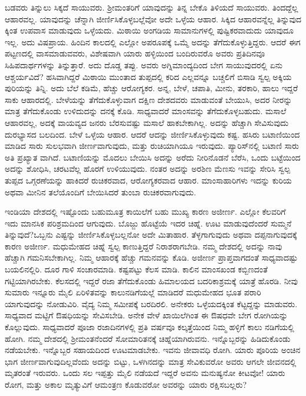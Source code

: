 ಬಡವರು ತಿನ್ನುಲು ಸಿಕ್ಕದೆ ಸಾಯುವರು. ಶ‍್ರೀಮಂತರಿಗೆ ಯಾವುದನ್ನು ತಿನ್ನ ಬೇಕೊ ತಿಳಿಯದೆ ಸಾಯುವರು. ತಿಂದದ್ದೆಲ್ಲ ಆಹಾರವಲ್ಲ. ಯಾವುದನ್ನು ಚೆನ್ನಾಗಿ ಜೀರ್ಣಿಸಿಕೊಳ್ಳಬಲ್ಲೆವೋ ಅದೇ ಒಳ್ಳೆಯ ಆಹಾರ. ಸಿಕ್ಕಿದ ಆಹಾರವನ್ನೆಲ್ಲ ತಿನ್ನುವುದ ಕ್ಕಿಂತ ಉಪವಾಸ ಮಾಡುವುದು ಒಳ್ಳೆಯದು. ಮಿಠಾಯಿ ಅಂಗಡಿಯ ಸಾಮಾನುಗಳಲ್ಲಿ ಪುಷ್ಟಿಕರವಾದುದು ಯಾವುದೂ ಇಲ್ಲ. ಅದು ವಿಷಪ್ರಾಯ. ಹಿಂದಿನ ಕಾಲದಲ್ಲಿ ಎಲ್ಲೋ ಅಪರೂಪಕ್ಕೆ ಒಮ್ಮೆ ಅದನ್ನು ತೆಗೆದುಕೊಳ್ಳುತ್ತಿದ್ದರು. ಆದರೆ ಈಗ ಪಟ್ಟಣದಲ್ಲಿ ವಾಸಮಾಡು\break ವವರು, ವಿಶೇಷವಾಗಿ ಯಾರು ಹಳ್ಳಿಯಿಂದ ಬಂದಿರುವರೊ ಅವರು ಪ್ರತಿದಿನವೂ ಸಿಹಿಪದಾರ್ಥಗಳನ್ನು ತಿನ್ನುತ್ತಾರೆ. ಅದು ದೊಡ್ಡ ತಪ್ಪು. ಅವರು ಅಗ್ನಿಮಾಂದ್ಯದಿಂದ ಬೇಗ ಸಾಯುವುದರಲ್ಲಿ ಏನು ಆಶ್ಚರ್ಯವಿದೆ? ಹಸಿವಾಗಿದ್ದರೆ ಮಿಠಾಯಿ ಮುಂತಾದ ತುಪ್ಪದಲ್ಲಿ ಕರಿದ ಎಲ್ಲವನ್ನೂ ಬಚ್ಚಲಿಗೆ ಬಿಸಾಡಿ ಸ್ವಲ್ಪ ಅಕ್ಕಿಯ ಪುರಿಯನ್ನು ತಿನ್ನಿ. ಅದು ಬೆಲೆ ಕಡಿಮೆ, ಹೆಚ್ಚು ಆರೋಗ್ಯಕರ. ಅನ್ನ, ಬೇಳೆ, ಚಪಾತಿ, ಮೀನು, ತರಕಾರಿ, ಹಾಲು ಇದ್ದರೆ ಸಾಕು ಆಹಾರದಲ್ಲಿ. ಬೇಳೆಯನ್ನು ತೆಗೆದುಕೊಳ್ಳುವಾಗ ದಕ್ಷಿಣ ದೇಶದವರು ಮಾಡುವಂತೆ ಬೇಯುಸಿ, ಅದರ ನೀರನ್ನು ಮಾತ್ರ ತೆಗೆದುಕೊಂಡು ಉಳಿದುದನ್ನು ದನಕ್ಕೆ ಕೊಡಿ. ಸಾಧ್ಯವಾದರೆ ಮಾಂಸವನ್ನು ತೆಗೆದುಕೊಳ್ಳಬಹುದು. ಮಸಾಲೆ ಆಹಾರವಲ್ಲ, ಅದಕ್ಕೆ ವಾಯವ್ಯದ ಜನರು ಬೆರಸುವಷ್ಟು ಮಸಾಲೆ ಹಾಕಬೇಕಾಗಿಲ್ಲ. ಅದನ್ನು ಹೆಚ್ಚಾಗಿ ಸೇವಿಸುವುದು ದುರಭ್ಯಾಸದ ಬಲದಿಂದ. ಬೇಳೆ ಒಳ್ಳೆಯ ಆಹಾರ. ಆದರೆ ಆದನ್ನು ಜೀರ್ಣಿಸಿಕೊಳ್ಳುವುದು ಕಷ್ಟ. ಹಸಿರು ಬಟಾಣಿಯಿಂದ ಮಾಡಿದ ಸಾರು ಸುಲಭವಾಗಿ ಜೀರ್ಣವಾಗುವುದು, ಮತ್ತು ರುಚಿಯಾಗಿಯೂ ಇರುವುದು. ಪ್ಯಾರಿಸ್​ನಲ್ಲಿ ಬಟಾಣಿ ಸಾರು ಅತಿ ಪ್ರಖ್ಯಾತ ವಾಗಿದೆ. ಬಟಾಣಿಯನ್ನು ಮೊದಲು ಬೇಯಿಸಿ ಅದನ್ನು ಅರೆದು ನೀರಿನೊಡನೆ ಬೆರೆಸಿ, ಒಂದು ಬಟ್ಟೆಯಿಂದ ಅದನ್ನು ಶೋಧಿಸಿ, ಚರಟವೆಲ್ಲ ಹೊರಗೆ ಉಳಿಯುವುದು. ನಂತರ ಅದನ್ನು ಅರಶಿಣ ಮೆಣಸು ಇವನ್ನು ಸೇರಿಸಿ ಸ್ವಲ್ಪ ತುಪ್ಪದ ಒಗ್ಗರಣೆಯನ್ನು ಹಾಕಿದರೆ ರುಚಿಕರವಾದ, ಆರೋಗ್ಯಕರವಾದ ಆಹಾರ. ಮಾಂಸಾಹಾರಿಗಳು ಇದನ್ನು ಕುರಿಯ ಅಥವಾ ಮೀನಿನ ತಲೆಯೊಂದಿಗೆ ಬೇಯಿಸಿದರೆ ತುಂಬಾ ರುಚಿಕರವಾಗುವುದು.

ಇಂಡಿಯಾ ದೇಶದಲ್ಲಿ ಇಷ್ಟೊಂದು ಬಹುಮೂತ್ರ ಕಾಯಿಲೆಗೆ ಬಹು ಮುಖ್ಯ ಕಾರಣ ಅಜೀರ್ಣ. ಎಲ್ಲೋ ಕೆಲವರಿಗೆ ಇದು ಮಾನಸಿಕ ಪರಿಶ್ರಮದಿಂದ ಆಗುವುದು. ಬೊಜ್ಜು ಹೊಟ್ಟೆಯೆ ಇದರ ಚಿಹ್ನೆ. ಊಟ ಮಾಡುವುದೆಂದರೆ ಸುಮ್ಮನೆ ತಿನ್ನುವುದೆ?ಒಬ್ಬನು ಎಷ್ಟನ್ನು ಜೀರ್ಣಿಸಿಕೊಳ್ಳಬಲ್ಲನೋ ಅದೇ ಮಿತಾಹಾರ. ತೆಳ್ಳಗಾಗುವುದು ಅಥವಾ ದಪ್ಪನಾಗುವುದಕ್ಕೆ ಕಾರಣ ಅಜೀರ್ಣ. ಮಧುಮೇಹದ ಚಿಹ್ನೆ ಸ್ವಲ್ಪ ಕಾಣುತ್ತಿದ್ದರೆ ನಿರಾಶರಾಗಬೇಡಿ. ನಮ್ಮ ದೇಶದಲ್ಲಿ ಅದನ್ನು ನಾವು ಹೆಚ್ಚಾಗಿ ಗಮನಿಸಬೇಕಾಗಿಲ್ಲ. ನಿಮ್ಮ ಆಹಾರಕ್ಕೆ ಹೆಚ್ಚು ಗಮನವನ್ನು ಕೊಡಿ. ಅಜೀರ್ಣ ಪ್ರಾಪ್ತವಾಗದಂತೆ ಸಾಧ್ಯವಾದಷ್ಟು ಬಯಲಿನಲ್ಲಿರಿ. ದೂರ ಗಾಳಿ ಸಂಚಾರಮಾಡಿ. ಕಷ್ಟಪಟ್ಟು ಕೆಲಸ ಮಾಡಿ. ಕಾಲಿನ ಮಾಂಸಖಂಡ ಕಬ್ಬಿಣದಂತೆ ಗಟ್ಟಿಯಾಗಿರಬೇಕು. ಕೆಲಸದಲ್ಲಿ ಇದ್ದರೆ ರಜಾ ತೆಗೆದುಕೊಂಡು ಹಿಮಾಲಯದ ಬದರಿಕಾ\break ಶ್ರಮಕ್ಕೆ ಯಾತ್ರೆ ಹೊರಡಿ. ನೀವು ಸುಮಾರು ಇನ್ನೂರು ಮೈಲಿ ಏರಿಳಿತವನ್ನು ಕಾಲುನಡಿಗೆ\break ಯಲ್ಲೆ ಮಾಡಿದರೆ ಮಧುಮೇಹದ ಭೂತ ಪರಾರಿ ಯಾಗುವುದನ್ನು ನೋಡುವಿರಿ. ವೈದ್ಯ ನಿಮ್ಮ ಸಮೀಪಕ್ಕೆ ಬರದಿರಲಿ. ಅನೇಕರು ಒಳ್ಳೆಯದಕ್ಕಿಂತ ಕೆಟ್ಟದ್ದನ್ನು ಮಾಡುವರು. ಸಾಧ್ಯವಾದ ಮಟ್ಟಿಗೆ ಔಷಧಿಯನ್ನು ಸೇವಿಸಬೇಡಿ. ಅನೇಕ ವೇಳೆ ಖಾಯಿಲೆಗಿಂತ ಈ ಔಷಧವೇ ಬೇಗ ರೋಗಿಯನ್ನು ಕೊಲ್ಲುವುದು. ಸಾಧ್ಯವಾದರೆ ಪೂಜಾ ರಜಾದಿನಗಳಲ್ಲಿ ಪ್ರತಿ ವರ್ಷವೂ ಕಲ್ಕತ್ತೆಯಿಂದ ನಿಮ್ಮ ಹಳ್ಳಿಗೆ ಕಾಲು ನಡಿಗೆಯಲ್ಲಿ ಹೋಗಿ. ನಮ್ಮ ದೇಶದಲ್ಲಿ ಶ‍್ರೀಮಂತನೆಂದರೆ ಸೋಮಾರಿತನಕ್ಕೆ ಚಿಹ್ನೆಯಾಗಿರುವನು. ಇನ್ನೊಬ್ಬರನ್ನು ಹಿಡಿದುಕೊಂಡು ನಡೆಯಬೇಕು. ಇನ್ನೊಬ್ಬರ ಸಹಾಯದಿಂದ ಊಟಮಾಡಬೇಕು. ಇವನು ಜೀವಾವಧಿ ರೋಗಿ. ಯಾರು ಪೂರಿಯ ಅಂಚಿನ ಭಾಗ ಜೀರ್ಣವಾಗುವುದಿಲ್ಲವೆಂದು ಅದನ್ನು ಬಿಟ್ಟು, ಒಳಗಿನದನ್ನು ಮಾತ್ರ ಸೇವಿಕುವರೋ ಅವರು ಆಗಲೇ ಜೀವನದಲ್ಲಿ ಮೃತರಂತೆ ಇರುವರು. ಒಂದು ಸಲ ಇಪ್ಪತ್ತು ಮೈಲಿ ನಡೆಯದೆ ಇದ್ದರೆ ಅವನು ಮನುಷ್ಯನೋ ಕೀಟವೋ! ಯಾರು ರೋಗ, ಮತ್ತು ಅಕಾಲ ಮೃತ್ಯುವಿಗೆ ಆಮಂತ್ರಣ ಕೊಡುವರೋ ಅವರನ್ನು ಯಾರು ರಕ್ಷಿಸಬಲ್ಲರು?

